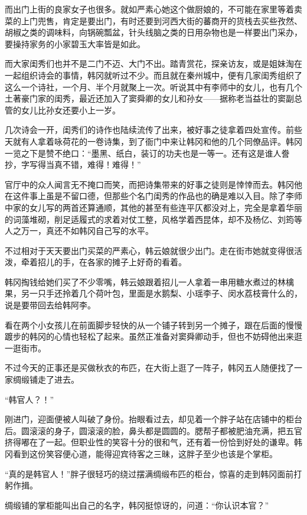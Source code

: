 而出门上街的良家女子也很多。就如严素心她这个做厨娘的，不可能在家里等着卖菜的上门兜售，肯定是要出门，有时还要到河西大街的蕃商开的货栈去买些孜然、胡椒之类的调味料，向锅碗瓢盆，针头线脑之类的日用杂物也是一样要出门采办，要操持家务的小家碧玉大率皆是如此。

而大家闺秀们也并不是二门不迈、大门不出。踏青赏花，探亲访友，或是姐妹淘在一起组织诗会的事情，韩冈就听过不少。而且就在秦州城中，便有几家闺秀组织了这么一个诗社，一个月、半个月就聚上一次。听说其中有李师中的女儿，也有几个土著豪门家的闺秀，最近还加入了窦舜卿的女儿和孙女——据称老当益壮的窦副总管的女儿比孙女还要小上一岁。

几次诗会一开，闺秀们的诗作也陆续流传了出来，被好事之徒拿着四处宣传。前些天就有人拿着咏荷花的一卷诗集，到了衙门中来让韩冈和他的几个同僚品评。韩冈一览之下是赞不绝口：“墨黑、纸白，装订的功夫也是一等一。还有这是谁人誊抄，字写得当真不错，难得！难得！”

官厅中的众人闻言无不掩口而笑，而把诗集带来的好事之徒则是悻悻而去。韩冈他在这件事上虽是不留口德，但那些个名门闺秀的作品也的确是难以入目。除了李师中家的女儿写的两首还算通顺，其他的甚至有些连平仄都没对上，完全是拿着华丽的词藻堆砌，削足适履式的求着对仗工整，风格学着西昆体，却不及杨亿、刘筠等人之万一，真还不如韩冈自己写的水平。

不过相对于天天要出门买菜的严素心，韩云娘就很少出门。走在街市她就变得很活泼，牵着招儿的手，在各家的摊子上好奇的看着。

韩冈掏钱给她们买了不少零嘴，韩云娘跟着招儿一人拿着一串用糖水煮过的林檎果，另一只手还拎着几个荷叶包，里面是水鹅梨、小瑶李子、闵水荔枝膏什么的，说是要带回去给韩阿李。

看在两个小女孩儿在前面脚步轻快的从一个铺子转到另一个摊子，跟在后面的慢慢踱步的韩冈的心情也轻松了起来。虽然正准备对窦舜卿动手，但也不妨碍他出来逛一逛街市。

不过今天的正事还是买做秋衣的布匹，在大街上逛了一阵子，韩冈五人随便找了一家绸缎铺走了进去。

“韩官人？！”

刚进门，迎面便被人叫破了身份。抬眼看过去，却见着一个胖子站在店铺中的柜台后。圆滚滚的身子，圆滚滚的脸，鼻头都是圆圆的。腮帮子都被肥油充满，把五官挤得嘟在了一起。但职业性的笑容十分的很和气，还有着一份恰到好处的谦卑。韩冈看到这份笑容便心道，能得迎宾待客之三昧，这胖子至少也该是个掌柜。

“真的是韩官人！”胖子很轻巧的绕过摆满绸缎布匹的柜台，惊喜的走到韩冈面前打躬作揖。

绸缎铺的掌柜能叫出自己的名字，韩冈挺惊讶的，问道：“你认识本官？”

